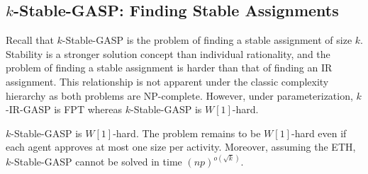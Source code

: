 \subsection{$k$-Stable-GASP: Finding Stable Assignments}

Recall that $k$-Stable-GASP is the problem of finding a stable assignment of size $k$. 
Stability is a stronger solution concept than individual rationality, and the problem of finding a stable assignment is harder than that of finding an IR assignment. This relationship is not apparent under the classic complexity hierarchy as both problems are NP-complete. However, under parameterization, $k$-IR-GASP is FPT whereas $k$-Stable-GASP is $W[1]$-hard.

\begin{theorem}
$k$-Stable-GASP is $W[1]$-hard.
The problem remains to be $W[1]$-hard even if each agent approves at most one size per activity.
Moreover, assuming the ETH, $k$-Stable-GASP cannot be solved in time $(np)^{o(\sqrt{k})}$.
\end{theorem}
